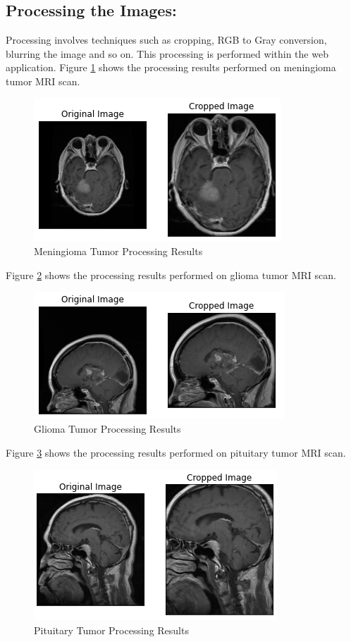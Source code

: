 \subsection{Processing the Images:}
Processing involves techniques such as cropping, RGB to Gray conversion, blurring the image and so on. This processing is performed within the web application.
Figure \ref{fig:menin_process} shows the processing results performed on meningioma tumor MRI scan.
\begin{figure}[H]
\includegraphics[scale=1]{Photos/menin_process.PNG}
\caption{Meningioma Tumor Processing Results} \label{fig:menin_process}
\end{figure}
Figure \ref{fig:glio_process} shows the processing results performed on glioma tumor MRI scan.
\begin{figure}[H]
\includegraphics[scale=1]{Photos/glioma_process.png}
\caption{Glioma Tumor Processing Results} \label{fig:glio_process}
\end{figure}
Figure \ref{fig:pitu_process} shows the processing results performed on pituitary tumor MRI scan.
\begin{figure}[H]
\includegraphics[scale=1]{Photos/pitu_process.PNG}
\caption{Pituitary Tumor Processing Results} \label{fig:pitu_process}
\end{figure}
